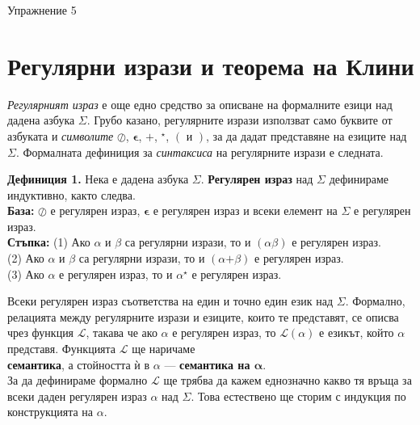 \documentclass{article}
\newcommand{\bleft}{
    \boldsymbol{\left(\right.}
}
\newcommand{\bright}{
    \boldsymbol{\left.\right)}
}
\newcommand{\bplus}{
    \boldsymbol{+}
}
\newcommand{\bepsilon}{
    \boldsymbol{\epsilon}
}
\begin{document}
\begin{center}
    {\huge Упражнение 5}
\end{center}

\vspace{15pt}

\section{Регулярни изрази и теорема на Клини}
\hspace{15pt} \textit{Регулярният израз} е още едно средство за описване на формалните езици 
    над дадена азбука $\Sigma$. Грубо казано, регулярните изрази използват само буквите
    от азбуката и \textit{символите} $\oslash$, $\bepsilon$, $\bplus$, $^\star$, $\bleft$ и $\bright$, за да дадат 
    представяне на езиците над $\Sigma$. Формалната дефиниция за \textit{синтаксиса} на 
    регулярните изрази е следната.

    \vspace{15pt}

    \textbf{Дефиниция 1.} Нека е дадена азбука $\Sigma$. \textbf{Регулярен израз} над
    $\Sigma$ дефинираме индуктивно, както следва. \\
    \vspace{10pt}
    \textbf{База:} $\oslash$ е регулярен израз, $\bepsilon$ е регулярен израз
    и всеки елемент на $\Sigma$ е регулярен израз. \\
    \vspace{5pt}
    \textbf{Стъпка:} (1) Ако $\alpha$ и $\beta$ са регулярни изрази, то и $\bleft \alpha \beta \bright$
    е регулярен израз. \\
    (2) Ако $\alpha$ и $\beta$ са регулярни изрази, то и $\bleft \alpha \bplus \beta \bright$
    е регулярен израз. \\
    (3) Ако $\alpha$ е регулярен израз, то и $\alpha^\star$ е регулярен израз.

    \vspace{10pt}

    \hspace{15pt} Всеки регулярен израз съответства на един и точно един език над $\Sigma$.
    Формално, релацията между регулярните изрази и езиците, които те представят, се описва
    чрез функция $\mathscr{L}$, такава че ако $\alpha$ е регулярен израз, то $\mathscr{L}(\alpha)$
    е езикът, който $\alpha$ представя. Функцията $\mathscr{L}$ ще наричаме \\
    \textbf{семантика}, а стойността ѝ в $\alpha$ — \textbf{семантика на $\boldsymbol{\alpha}$}. \\
    \hspace{15pt} За да дефинираме формално $\mathscr{L}$ ще трябва да кажем еднозначно
    какво тя връща за всеки даден регулярен израз $\alpha$ над $\Sigma$. Това естествено
    ще сторим с индукция по конструкцията на $\alpha$. \\
\end{document}
